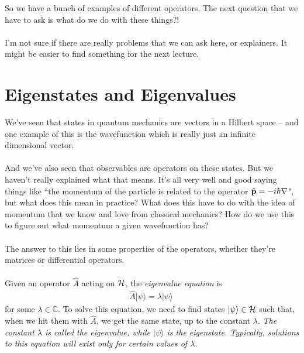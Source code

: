 \documentclass[12pt]{article}
\def\be{\begin{eqnarray}}
\def\ee{\end{eqnarray}}
\newcommand\para{\paragraph{}}
\newcommand{\ket}[1]{|#1\rangle}
\newcommand{\co}{\color{olive}}
\newcommand{\cblue}{\color{blue}}
\newcommand{\C}{{\mathds C}}
\newcommand{\bp}{{\bf p}}
\begin{document}
{So we have a bunch of examples of different operators. The next question that we have to ask is what do we do with these things?!

\para
{\cblue I'm not sure if there are really problems that we can ask here, or explainers. It might be easier to find something for the next lecture.}



\newpage

\section{Eigenstates and Eigenvalues}

We've seen that states in quantum mechanics are vectors in a Hilbert space -- and one example of this is the wavefunction which is really just an infinite dimensional vector.

\para
And we've also seen that observables are operators on these states. But we haven't really explained what that means.  It's all very well and good saying things like ``the momentum of the particle is related to the operator $\hat{\bp} = -i\hbar\nabla$", but what does this mean in practice?  What does this have to do with the idea of momentum that we know and love from classical mechanics? How do we use this to figure out what momentum a given wavefunction has?

\para
The answer to this lies in some properties of the operators, whether they're matrices or differential operators. 

\para
{\co
Given an operator $\hat{A}$ acting on ${\cal H}$, the {\it eigenvalue equation} is
%
\be \hat{A}\ket{\psi} = \lambda\ket{\psi}\ \label{eigen1}\ee
%
for some $\lambda\in \C$.} To solve this equation, we need to find states $\ket{\psi}\in{\cal H}$ such that, when we hit them with $\hat{A}$, we get the same state, up to the constant $\lambda$.  {\it The constant $\lambda$ is called the {\it eigenvalue}, while $\ket{\psi}$ is the {\it eigenstate}. Typically, solutions to this equation will exist only for certain values of $\lambda$.} 

}
\end{document}
